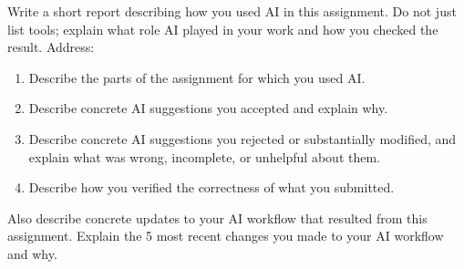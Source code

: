 \documentclass[11pt]{article}
\begin{document}
 
Write a short report describing how you used AI in this assignment. Do not just list tools; explain what role AI played in your work and how you checked the result. Address:
\begin{enumerate}[leftmargin=2em]
\item Describe the parts of the assignment for which you used AI.
\item Describe concrete AI suggestions you accepted and explain why.
\item Describe concrete AI suggestions you rejected or substantially modified, and explain what was wrong, incomplete, or unhelpful about them.
\item Describe how you verified the correctness of what you submitted.
\end{enumerate}
Also describe concrete updates to your AI workflow that resulted from this assignment. Explain the 5 most recent changes you made to your AI workflow and why.
 
\end{document}
